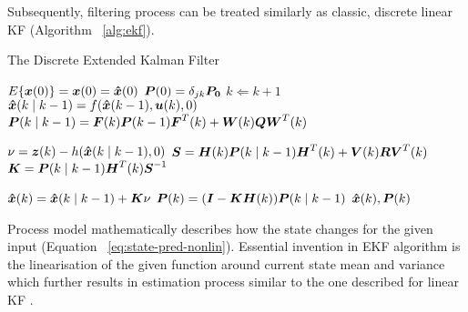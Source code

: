 Subsequently, filtering process can be treated similarly as classic, discrete linear KF (Algorithm ~\ref{alg:ekf}). 
\begin{algorithm}%
\caption{The Discrete Extended Kalman Filter} \label{alg:ekf}
\begin{algorithmic}
\REQUIRE $E\lbrace \boldsymbol{x}(0) \rbrace = \boldsymbol{x}(0) = \boldsymbol{\hat{x}}(0)$
\REQUIRE $\boldsymbol{P}(0) = \delta_{jk} \boldsymbol{P_{0}} $ 
\LOOP 
	\STATE $k \Leftarrow k+1$ 
	\STATE $\boldsymbol{\hat{x}}(k \mid k-1) = f(\boldsymbol{\hat{x}}(k-1), \boldsymbol{u}(k), 0)$
	\STATE $\boldsymbol{P}(k \mid k-1) = \boldsymbol{F}(k) \boldsymbol{P}(k-1) \boldsymbol{F}^{T}(k) + \boldsymbol{W}(k) \boldsymbol{Q} \boldsymbol{W}^{T}(k)$
	
	\STATE $\nu = \boldsymbol{z}(k) - h(\boldsymbol{\hat{x}}(k \mid k-1), 0)$	
	\STATE $\boldsymbol{S} = \boldsymbol{H}(k) \boldsymbol{P}(k \mid k-1) \boldsymbol{H}^{T}(k) + \boldsymbol{V}(k) \boldsymbol{R} \boldsymbol{V}^{T}(k)$	
	\STATE $\boldsymbol{K} = \boldsymbol{P}(k \mid k-1) \boldsymbol{H}^{T}(k) \boldsymbol{S}^{-1}$	
	
	\STATE $\boldsymbol{\hat{x}}(k) = \boldsymbol{\hat{x}}(k \mid k-1) + \boldsymbol{K} \nu$
	\STATE $\boldsymbol{P}(k) = (\boldsymbol{I}-\boldsymbol{K}\boldsymbol{H}(k))\boldsymbol{P}(k \mid k-1)$
	\RETURN $\boldsymbol{\hat{x}}(k), \boldsymbol{P}(k)$
\ENDLOOP
\end{algorithmic}
\end{algorithm}
Process model mathematically describes how the state changes for the given input (Equation ~\ref{eq:state-pred-nonlin}). Essential invention in EKF algorithm is the linearisation of the given function around current state mean and variance which further results in estimation process similar to the one described for linear KF \cite{kalman60}.